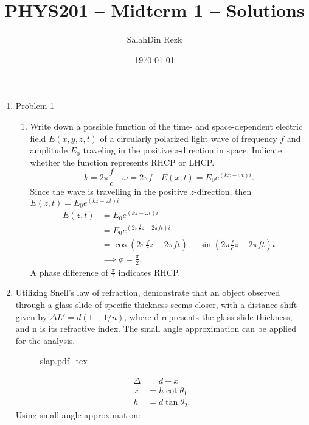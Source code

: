 \documentclass{article}
\title{PHYS201 -- Midterm 1 -- Solutions}
\author{SalahDin Rezk}
\date{\today}
\newcommand{\incfig}[2][1]{%
    \def\svgwidth{#1\columnwidth}
    {#2.pdf_tex}
}
\begin{document}
\maketitle

\begin{enumerate}
  \item Problem 1
    \begin{enumerate}
      \item Write down a possible function of the time- and space-dependent
        electric field $E(x, y, z, t)$ of a circularly polarized light wave of
        frequency $f$ and amplitude $E_0$ traveling in the positive $z$-direction in
        space. Indicate whether the function represents RHCP or LHCP.
        \begin{equation}
          k = 2\pi \frac{f}{c} \quad \omega = 2\pi f \quad E(x,t) = E_0 e^{(kx-\omega t)i}
        .\end{equation}
        Since the wave is travelling in the positive $z$-direction, then $E(z,t)=E_0e^{(kz-\omega t)i}$
        \begin{align}
          E(z,t)&=E_0e^{(kz-\omega t)i} \\
                &= E_0 e^{(2\pi \frac{f}{c}z - 2\pi ft)i} \\
                &= \cos \left( 2\pi \frac{f}{c}z-2\pi ft \right) + \sin \left( 2\pi \frac{f}{c}z-2\pi ft \right)i \\
                &\implies \phi = \frac{\pi}{2}
        .\end{align}
        A phase difference of $\frac{\pi}{2}$ indicates RHCP.
    \end{enumerate}
  \item Utilizing Snell's law of refraction, demonstrate that an object
    observed through a glass slide of specific thickness seems closer, with a
    distance shift given by $\Delta L' = d (1-1/n)$, where d represents the glass slide
    thickness, and n is its refractive index. The small angle approximation can
    be applied for the analysis.
\begin{figure}[ht]
    \centering
    \incfig{slap}
    \caption{}
    \label{fig:slap}
\end{figure}
    \begin{align}
      \Delta &= d-x \\
      x &= h\cot \theta_1 \\
      h &= d\tan\theta_2
    .\end{align}
    Using small angle approximation:

\end{enumerate}
\end{document}

